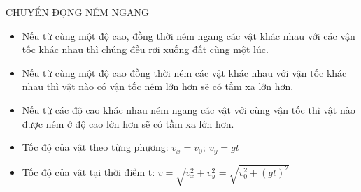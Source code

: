 \begin{dang}{CHUYỂN ĐỘNG NÉM NGANG}
\begin{itemize}
\item Nếu từ cùng một độ cao, đồng thời ném ngang các vật khác nhau với các vận tốc khác nhau thì chúng đều rơi xuống đất cùng một lúc.
\item Nếu từ cùng một độ cao đồng thời ném các vật khác nhau với vận tốc khác nhau thì vật nào có vận tốc ném lớn hơn sẽ có tầm xa lớn hơn.
\item Nếu từ các độ cao khác nhau ném ngang các vật với cùng vận tốc thì vật nào được ném ở độ cao lớn hơn sẽ có tầm xa lớn hơn.
\item Tốc độ của vật theo từng phương: $v_x=v_0;\ v_y=gt$
\item Tốc độ của vật tại thời điểm t: $v=\sqrt{v_x^2+v_y^2}=\sqrt{v_0^2+\left(gt\right)^2}$ 
\end{itemize}
\end{dang}
